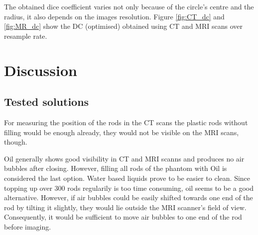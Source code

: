\documentclass[parskip,bibtotoc,final,twoside=false,titlepage,a4paper,english,12pt,titlepage,a4paper]{scrbook}
\begin{document}
The obtained dice coefficient varies not only because of the circle's centre and the radius, it also depends on the images resolution.
Figure \ref{fig:CT_dc} and \ref{fig:MR_dc} show the DC (optimised) obtained using CT and MRI scans over resample rate.


\chapter{Discussion}


\section{Tested solutions}

For measuring the position of the rods in the CT scans the plastic rods without filling would be enough already, they would not be visible on the MRI scans, though.

Oil generally shows good visibility in CT and MRI scanns and produces no air bubbles after closing.
However, filling all rods of the phantom with Oil is considered the last option. Water based liquids prove to be easier to clean.
Since topping up over 300 rods regularily is too time consuming, oil seems to be a good alternative.
However, if air bubbles could be easily shifted towards one end of the rod by tilting it slightly, they would lie outside the MRI scanner's field of view.
Consequently, it would be sufficient to move air bubbles to one end of the rod before imaging.
\end{document}
